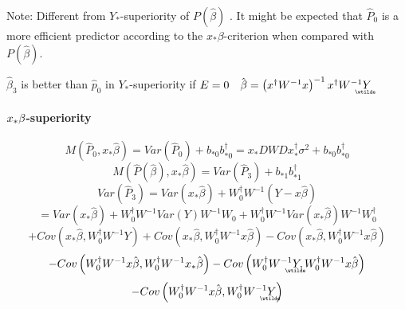 \documentclass{article}
\begin{document}
\bigskip

Note: Different from $Y_{\ast }$-superiority of $P\left( \hat{\beta}\right) $%
. It might be expected that $\hat{P}_{0}$ is a more efficient predictor
according to the $x_{\ast }\beta $-criterion when compared with $P\left( 
\hat{\beta}\right) $.

$\hat{\beta}_{3}$ is better than $\hat{p}_{0}$ in $Y_{\ast }$-superiority if 
$E=0\quad \hat{\beta}=\left( x^{\dagger }W^{-1}x\right) ^{-1}x^{\dagger
}W^{-1}%
\underaccent{\wtilde}{Y}%
$

\bigskip

\paragraph{$x_{\ast }\protect\beta $-superiority}

\begin{equation*}
M\left( \hat{P}_{0},x_{\ast }\hat{\beta}\right) =Var\left( \hat{P}%
_{0}\right) +b_{\ast 0}b_{\ast 0}^{\dagger }=x_{\ast }DWDx_{\ast }^{\dagger
}\sigma ^{2}+b_{\ast 0}b_{\ast 0}^{\dagger }
\end{equation*}%
\begin{equation*}
M\left( \hat{P}\left( \hat{\beta}\right) ,x_{\ast }\hat{\beta}\right)
=Var\left( \hat{P}_{3}\right) +b_{\ast 1}b_{\ast 1}^{\dagger }
\end{equation*}%
\begin{equation*}
Var\left( \hat{P}_{3}\right) =Var\left( x_{\ast }\hat{\beta}\right)
+W_{0}^{\dagger }W^{-1}\left( Y-x\hat{\beta}\right)
\end{equation*}%
\begin{equation*}
=Var\left( x_{\ast }\hat{\beta}\right) +W_{0}^{\dagger }W^{-1}Var\left(
Y\right) W^{-1}W_{0}+W_{0}^{\dagger }W^{-1}Var\left( x_{\ast }\hat{\beta}%
\right) W^{-1}W_{0}^{\dagger }
\end{equation*}%
\begin{equation*}
+Cov\left( x_{\ast }\hat{\beta},W_{0}^{\dagger }W^{-1}Y\right) +Cov\left(
x_{\ast }\hat{\beta},W_{0}^{\dagger }W^{-1}x\hat{\beta}\right) -Cov\left(
x_{\ast }\hat{\beta},W_{0}^{\dagger }W^{-1}x\hat{\beta}\right)
\end{equation*}%
\begin{equation*}
-Cov\left( W_{0}^{\dagger }W^{-1}x\hat{\beta},W_{0}^{\dagger }W^{-1}x_{\ast }%
\hat{\beta}\right) -Cov\left( W_{0}^{\dagger }W^{-1}%
\underaccent{\wtilde}{Y}%
,W_{0}^{\dagger }W^{-1}x\hat{\beta}\right)
\end{equation*}%
\begin{equation*}
-Cov\left( W_{0}^{\dagger }W^{-1}x\hat{\beta},W_{0}^{\dagger }W^{-1}%
\underaccent{\wtilde}{Y}%
\right)
\end{equation*}
\end{document}

